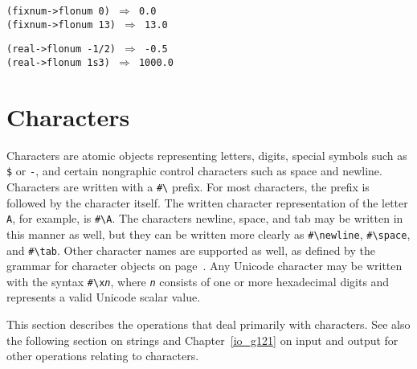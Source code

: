 \begin{alltt}
(fixnum-\textgreater{}flonum 0) \(\Rightarrow\) 0.0
(fixnum-\textgreater{}flonum 13) \(\Rightarrow\) 13.0

(real-\textgreater{}flonum -1/2) \(\Rightarrow\) -0.5
(real-\textgreater{}flonum 1s3) \(\Rightarrow\) 1000.0
\end{alltt}

\section{\label{objects_g113}\label{objects_h7}Characters\label{objects_SECTCHARACTERS}}



\label{objects_s199}Characters are atomic objects representing letters, digits,
special symbols such as \texttt{\${}} or \texttt{-}, and certain nongraphic
control characters such as space and newline.
Characters are written with a \label{objects_s200}\texttt{\#{}\textbackslash{}} prefix.
For most characters, the prefix is followed by the character itself.
The written character representation of the letter \texttt{A}, for example, is
\texttt{\#{}\textbackslash{}A}.
The characters newline, space, and tab
may be written in this manner as well, but they can be written
more clearly as \texttt{\#{}\textbackslash{}newline}, \texttt{\#{}\textbackslash{}space}, and \texttt{\#{}\textbackslash{}tab}.
Other character names are supported as well, as defined by the
grammar for character objects on page \pageref{grammar_grammar_characters}.
Any Unicode character may be written with the syntax \texttt{\#{}\textbackslash{}x\textit{n}},
where \texttt{\textit{n}} consists of one or more hexadecimal digits and represents
a valid Unicode scalar value.


This section describes the operations that deal primarily with characters.
See also the following section on strings and Chapter \ref{io_g121} on input and
output for other operations relating to characters.

